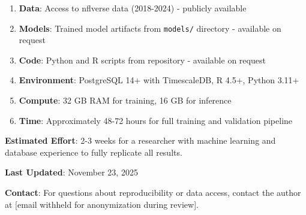 \begin{enumerate}
    \item \textbf{Data}: Access to nflverse data (2018-2024) - publicly available
    \item \textbf{Models}: Trained model artifacts from \texttt{models/} directory - available on request
    \item \textbf{Code}: Python and R scripts from repository - available on request
    \item \textbf{Environment}: PostgreSQL 14+ with TimescaleDB, R 4.5+, Python 3.11+
    \item \textbf{Compute}: 32 GB RAM for training, 16 GB for inference
    \item \textbf{Time}: Approximately 48-72 hours for full training and validation pipeline
\end{enumerate}

\textbf{Estimated Effort}: 2-3 weeks for a researcher with machine learning and database experience to fully replicate all results.


\textbf{Last Updated}: November 23, 2025

\textbf{Contact}: For questions about reproducibility or data access, contact the author at [email withheld for anonymization during review].
